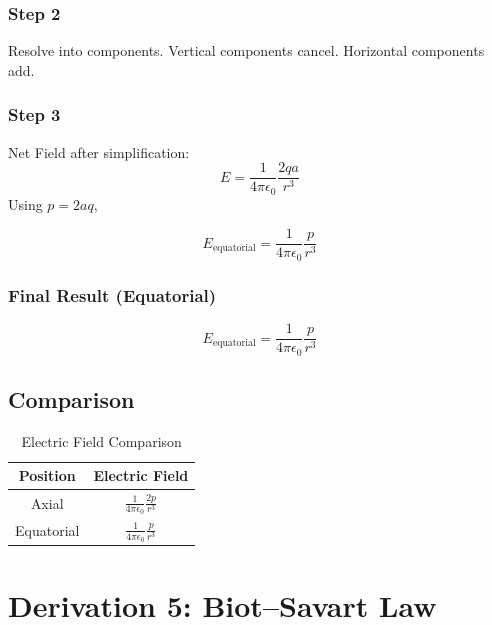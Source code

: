 \documentclass[11pt,a4paper]{article}
\begin{document}
\subsubsection*{Step 2}
Resolve into components. Vertical components cancel. Horizontal components add.

\subsubsection*{Step 3}
Net Field after simplification:
\[ E = \frac{1}{4\pi\epsilon_0} \frac{2qa}{r^3} \]
Using \( p = 2aq \),
\begin{tcolorbox}[colback=RoyalBlue!5!white, colframe=RoyalBlue]
    \[ E_{\text{equatorial}} = \frac{1}{4\pi\epsilon_0} \frac{p}{r^3} \]
\end{tcolorbox}

\subsubsection*{Final Result (Equatorial)}
\begin{tcolorbox}[colback=RoyalBlue!5!white, colframe=RoyalBlue]
    \[ E_{\text{equatorial}} = \frac{1}{4\pi\epsilon_0} \frac{p}{r^3} \]
\end{tcolorbox}

\subsection*{Comparison}
\begin{table}[htbp]
    \centering
    \caption{Electric Field Comparison}
    \vspace{0.2cm}
    \begin{tabular}{cc}
        \toprule
        \textbf{Position} & \textbf{Electric Field} \\
        \midrule
        Axial & \( \frac{1}{4\pi\epsilon_0}\frac{2p}{r^3} \) \\
        Equatorial & \( \frac{1}{4\pi\epsilon_0}\frac{p}{r^3} \) \\
        \bottomrule
    \end{tabular}
\end{table}


\section{Derivation 5: Biot--Savart Law}
\end{document}
